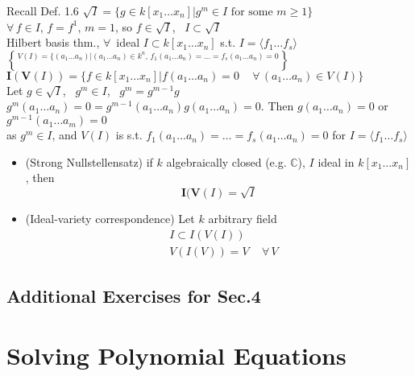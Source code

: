 \documentclass[10pt]{amsart}
\newcommand{\exercisehead}[1]
  { \smallskip
   \noindent{\small\bf Exercise #1.}
  }
\begin{document}
\begin{multicols*}{2}
Recall Def. 1.6 $\sqrt{I} = \lbrace g \in k[x_1 \dots x_n] |g^m \in I \text{ for some } m\geq 1\rbrace$ \\
$\forall \, f \in I$, $f=f^1$, $m=1$, so $f\in \sqrt{I}$, \quad \, $I\subset \sqrt{I}$ \\
\phantom{\quad \quad } Hilbert basis thm., $\forall \, $ ideal $I\subset k[x_1 \dots x_n]$ s.t. $I=\langle f_1 \dots f_s \rangle$ \\
\phantom{\quad } $V(I) = \lbrace (a_1 \dots a_n) |(a_1 \dots a_n) \in k^n, \, f_1(a_1\dots a_n) = \dots = f_s(a_1\dots a_n)=0\brace$ \\
$\mathbf{I}(\mathbf{V}(I)) = \lbrace f \in k[x_1 \dots x_n] | f(a_1 \dots a_n) =0 \quad \, \forall \, (a_1 \dots a_n) \in V(I) \rbrace$ \\
Let $g\in \sqrt{I}$, \, $g^m \in I$, \, $g^m=g^{m-1}g$  \\
\phantom{\quad \quad \,} $g^m(a_1 \dots a_n) =0 = g^{m-1}(a_1 \dots a_n)g(a_1 \dots a_n) =0$.  Then $g(a_1 \dots a_n)=0$ or $g^{m-1}(a_1\dots a_m)=0$ \\
\phantom{\quad }as $g^m\in I$, and $V(I)$ is s.t. $f_1(a_1 \dots a_n) = \dots = f_s(a_1 \dots a_n)=0$ for $I=\langle f_1 \dots f_s \rangle$

\begin{itemize}
  \item (Strong Nullstellensatz) if $k$ algebraically closed (e.g. $\mathbb{C}$), $I$ ideal in $k[x_1 \dots x_n]$, then 
\[
\mathbf{I}(\mathbf{V}(I) = \sqrt{I}
\]
\item (Ideal-variety correspondence) Let $k$ arbitrary field
\[
\begin{aligned}
  & I \subset I(V(I)) \\ 
  & V(I(V)) = V \quad \, \forall \, V
\end{aligned}
\]
\end{itemize}

\subsection*{Additional Exercises for Sec.4}

\exercisehead{6}



\section{ Solving Polynomial Equations}

\subsection{}


\end{multicols*}
\end{document}
